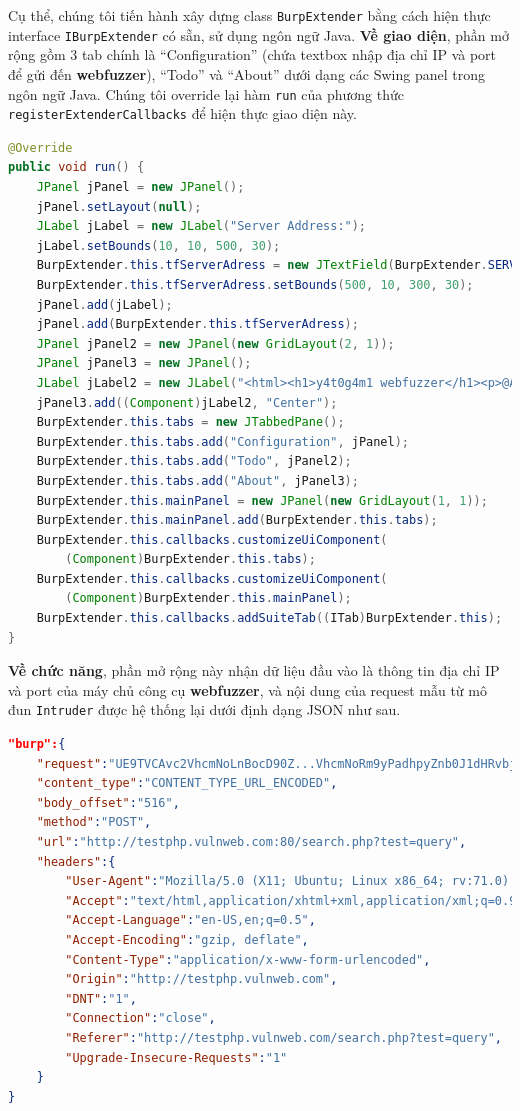 Cụ thể, chúng tôi tiến hành xây dựng class \texttt{BurpExtender} bằng cách hiện thực interface \texttt{IBurpExtender} có sẵn, sử dụng ngôn ngữ Java. \textbf{Về giao diện}, phần mở rộng gồm 3 tab chính là ``Configuration'' (chứa textbox nhập địa chỉ IP và port để gửi đến \textbf{webfuzzer}), ``Todo'' và ``About'' dưới dạng các Swing panel trong ngôn ngữ Java. Chúng tôi override lại hàm \texttt{run} của phương thức \texttt{registerExtenderCallbacks} để hiện thực giao diện này.\\
\begin{lstlisting}[language=Java]
@Override
public void run() {
    JPanel jPanel = new JPanel();
    jPanel.setLayout(null);
    JLabel jLabel = new JLabel("Server Address:");
    jLabel.setBounds(10, 10, 500, 30);
    BurpExtender.this.tfServerAdress = new JTextField(BurpExtender.SERVERADRESS);
    BurpExtender.this.tfServerAdress.setBounds(500, 10, 300, 30);
    jPanel.add(jLabel);
    jPanel.add(BurpExtender.this.tfServerAdress);
    JPanel jPanel2 = new JPanel(new GridLayout(2, 1));
    JPanel jPanel3 = new JPanel();
    JLabel jLabel2 = new JLabel("<html><h1>y4t0g4m1 webfuzzer</h1><p>@Author: y4t0g4m1</p><p>@Features:</p></html>");
    jPanel3.add((Component)jLabel2, "Center");
    BurpExtender.this.tabs = new JTabbedPane();
    BurpExtender.this.tabs.add("Configuration", jPanel);
    BurpExtender.this.tabs.add("Todo", jPanel2);
    BurpExtender.this.tabs.add("About", jPanel3);
    BurpExtender.this.mainPanel = new JPanel(new GridLayout(1, 1));
    BurpExtender.this.mainPanel.add(BurpExtender.this.tabs);
    BurpExtender.this.callbacks.customizeUiComponent(
        (Component)BurpExtender.this.tabs);
    BurpExtender.this.callbacks.customizeUiComponent(
        (Component)BurpExtender.this.mainPanel);
    BurpExtender.this.callbacks.addSuiteTab((ITab)BurpExtender.this);
}
\end{lstlisting}
\textbf{Về chức năng}, phần mở rộng này nhận dữ liệu đầu vào là thông tin địa chỉ IP và port của máy chủ công cụ \textbf{webfuzzer}, và nội dung của request mẫu từ mô đun \texttt{Intruder} được hệ thống lại dưới định dạng JSON như sau.\\
\begin{lstlisting}[language=json,firstnumber=1]
"burp":{ 
    "request":"UE9TVCAvc2VhcmNoLnBocD90Z...VhcmNoRm9yPadhpyZnb0J1dHRvbj1nbw==",
    "content_type":"CONTENT_TYPE_URL_ENCODED",
    "body_offset":"516",
    "method":"POST",
    "url":"http://testphp.vulnweb.com:80/search.php?test=query",
    "headers":{ 
        "User-Agent":"Mozilla/5.0 (X11; Ubuntu; Linux x86_64; rv:71.0) Gecko/20100101 Firefox/71.0",
        "Accept":"text/html,application/xhtml+xml,application/xml;q=0.9,*/*;q=0.8",
        "Accept-Language":"en-US,en;q=0.5",
        "Accept-Encoding":"gzip, deflate",
        "Content-Type":"application/x-www-form-urlencoded",
        "Origin":"http://testphp.vulnweb.com",
        "DNT":"1",
        "Connection":"close",
        "Referer":"http://testphp.vulnweb.com/search.php?test=query",
        "Upgrade-Insecure-Requests":"1"
    }
}
\end{lstlisting}
